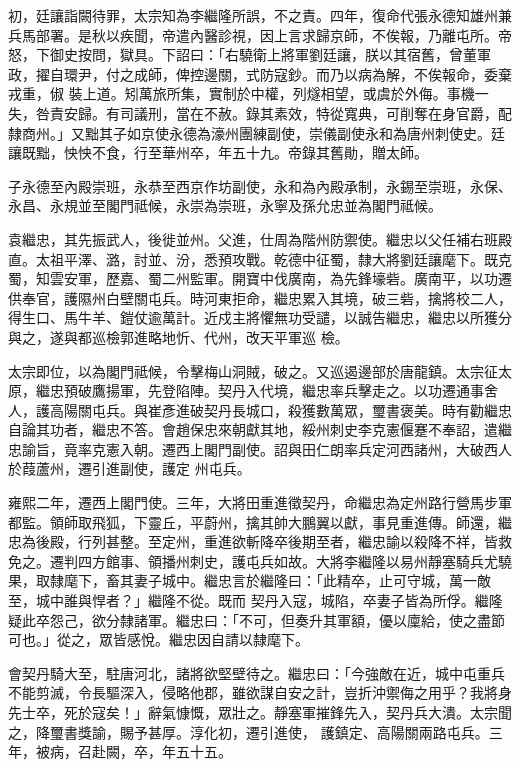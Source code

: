 \begin{pinyinscope}
 初，廷讓詣闕待罪，太宗知為李繼隆所誤，不之責。四年，復命代張永德知雄州兼兵馬部署。是秋以疾聞，帝遣內醫診視，因上言求歸京師，不俟報，乃離屯所。帝怒，下御史按問，獄具。下詔曰：「右驍衛上將軍劉廷讓，朕以其宿舊，曾董軍政，擢自環尹，付之成師，俾控邊關，式防寇鈔。而乃以病為解，不俟報命，委棄戎重，俶
 裝上道。矧萬旅所集，實制於中權，列燧相望，或虞於外侮。事機一失，咎責安歸。有司議刑，當在不赦。錄其素效，特從寬典，可削奪在身官爵，配隸商州。」又黜其子如京使永德為濠州團練副使，崇儀副使永和為唐州刺使史。廷讓既黜，怏怏不食，行至華州卒，年五十九。帝錄其舊勛，贈太師。



 子永德至內殿崇班，永恭至西京作坊副使，永和為內殿承制，永錫至崇班，永保、永昌、永規並至閣門祗候，永崇為崇班，永寧及孫允忠並為閣門祗候。



 袁繼忠，其先振武人，後徙並州。父進，仕周為階州防禦使。繼忠以父任補右班殿直。太祖平澤、潞，討並、汾，悉預攻戰。乾德中征蜀，隸大將劉廷讓麾下。既克蜀，知雲安軍，歷嘉、蜀二州監軍。開寶中伐廣南，為先鋒壕砦。廣南平，以功遷供奉官，護隰州白壁關屯兵。時河東拒命，繼忠累入其境，破三砦，擒將校二人，得生口、馬牛羊、鎧仗逾萬計。近戍主將懼無功受譴，以誠告繼忠，繼忠以所獲分與之，遂與都巡檢郭進略地忻、代州，改天平軍巡
 檢。



 太宗即位，以為閣門祗候，令擊梅山洞賊，破之。又巡遏邊部於唐龍鎮。太宗征太原，繼忠預破鷹揚軍，先登陷陣。契丹入代境，繼忠率兵擊走之。以功遷通事舍人，護高陽關屯兵。與崔彥進破契丹長城口，殺獲數萬眾，璽書褒美。時有勸繼忠自論其功者，繼忠不答。會趙保忠來朝獻其地，綏州刺史李克憲偃蹇不奉詔，遣繼忠諭旨，竟率克憲入朝。遷西上閣門副使。詔與田仁朗率兵定河西諸州，大破西人於葭蘆州，遷引進副使，護定
 州屯兵。



 雍熙二年，遷西上閣門使。三年，大將田重進徵契丹，命繼忠為定州路行營馬步軍都監。領師取飛狐，下靈丘，平蔚州，擒其帥大鵬翼以獻，事見重進傳。師還，繼忠為後殿，行列甚整。至定州，重進欲斬降卒後期至者，繼忠諭以殺降不祥，皆救免之。遷判四方館事、領播州刺史，護屯兵如故。大將李繼隆以易州靜塞騎兵尤驍果，取隸麾下，畜其妻子城中。繼忠言於繼隆曰：「此精卒，止可守城，萬一敵至，城中誰與悍者？」繼隆不從。既而
 契丹入寇，城陷，卒妻子皆為所俘。繼隆疑此卒怨己，欲分隸諸軍。繼忠曰：「不可，但奏升其軍額，優以廩給，使之盡節可也。」從之，眾皆感悅。繼忠因自請以隸麾下。



 會契丹騎大至，駐唐河北，諸將欲堅壁待之。繼忠曰：「今強敵在近，城中屯重兵不能剪滅，令長驅深入，侵略他郡，雖欲謀自安之計，豈折沖禦侮之用乎？我將身先士卒，死於寇矣！」辭氣慷慨，眾壯之。靜塞軍摧鋒先入，契丹兵大潰。太宗聞之，降璽書獎諭，賜予甚厚。淳化初，遷引進使，
 護鎮定、高陽關兩路屯兵。三年，被病，召赴闕，卒，年五十五。




\end{pinyinscope}
